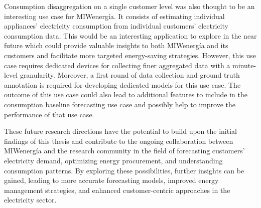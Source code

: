 Consumption disaggregation on a single customer level was also thought to be an interesting use case for MIWenergía.
It consists of estimating individual appliances' electricity consumption from individual customers' electricity consumption data.
This would be an interesting application to explore in the near future which could provide valuable insights to both MIWenergía and its customers and facilitate more targeted energy-saving strategies.
However, this use case requires dedicated devices for collecting finer aggregated data with a minute-level granularity.
Moreover, a first round of data collection and ground truth annotation is required for developing dedicated models for this use case.
The outcome of this use case could also lead to additional features to include in the consumption baseline forecasting use case and possibly help to improve the performance of that use case.

These future research directions have the potential to build upon the initial findings of this thesis and contribute to the ongoing collaboration between MIWenergía and the research community in the field of forecasting customers' electricity demand, optimizing energy procurement, and understanding consumption patterns.
By exploring these possibilities, further insights can be gained, leading to more accurate forecasting models, improved energy management strategies, and enhanced customer-centric approaches in the electricity sector.

